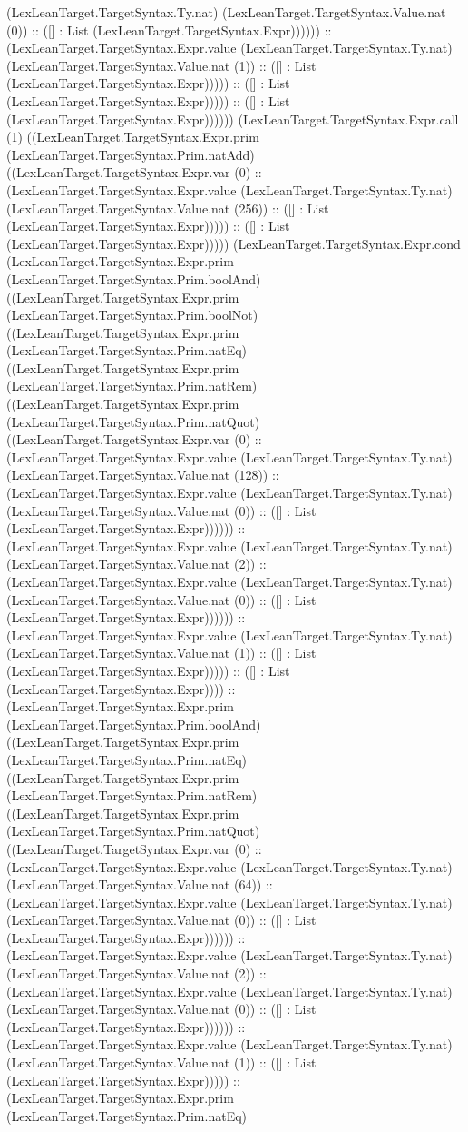 \documentclass[11pt]{article}
\begin{document}
(LexLeanTarget.TargetSyntax.Ty.nat) (LexLeanTarget.TargetSyntax.Value.nat (0)) :: ([] : List (LexLeanTarget.TargetSyntax.Expr)))))) :: (LexLeanTarget.TargetSyntax.Expr.value (LexLeanTarget.TargetSyntax.Ty.nat) (LexLeanTarget.TargetSyntax.Value.nat (1)) :: ([] : List (LexLeanTarget.TargetSyntax.Expr))))) :: ([] : List (LexLeanTarget.TargetSyntax.Expr))))) :: ([] : List (LexLeanTarget.TargetSyntax.Expr)))))) (LexLeanTarget.TargetSyntax.Expr.call (1) ((LexLeanTarget.TargetSyntax.Expr.prim (LexLeanTarget.TargetSyntax.Prim.natAdd) ((LexLeanTarget.TargetSyntax.Expr.var (0) :: (LexLeanTarget.TargetSyntax.Expr.value (LexLeanTarget.TargetSyntax.Ty.nat) (LexLeanTarget.TargetSyntax.Value.nat (256)) :: ([] : List (LexLeanTarget.TargetSyntax.Expr))))) :: ([] : List (LexLeanTarget.TargetSyntax.Expr))))) (LexLeanTarget.TargetSyntax.Expr.cond (LexLeanTarget.TargetSyntax.Expr.prim (LexLeanTarget.TargetSyntax.Prim.boolAnd) ((LexLeanTarget.TargetSyntax.Expr.prim (LexLeanTarget.TargetSyntax.Prim.boolNot) ((LexLeanTarget.TargetSyntax.Expr.prim (LexLeanTarget.TargetSyntax.Prim.natEq) ((LexLeanTarget.TargetSyntax.Expr.prim (LexLeanTarget.TargetSyntax.Prim.natRem) ((LexLeanTarget.TargetSyntax.Expr.prim (LexLeanTarget.TargetSyntax.Prim.natQuot) ((LexLeanTarget.TargetSyntax.Expr.var (0) :: (LexLeanTarget.TargetSyntax.Expr.value (LexLeanTarget.TargetSyntax.Ty.nat) (LexLeanTarget.TargetSyntax.Value.nat (128)) :: (LexLeanTarget.TargetSyntax.Expr.value (LexLeanTarget.TargetSyntax.Ty.nat) (LexLeanTarget.TargetSyntax.Value.nat (0)) :: ([] : List (LexLeanTarget.TargetSyntax.Expr)))))) :: (LexLeanTarget.TargetSyntax.Expr.value (LexLeanTarget.TargetSyntax.Ty.nat) (LexLeanTarget.TargetSyntax.Value.nat (2)) :: (LexLeanTarget.TargetSyntax.Expr.value (LexLeanTarget.TargetSyntax.Ty.nat) (LexLeanTarget.TargetSyntax.Value.nat (0)) :: ([] : List (LexLeanTarget.TargetSyntax.Expr)))))) :: (LexLeanTarget.TargetSyntax.Expr.value (LexLeanTarget.TargetSyntax.Ty.nat) (LexLeanTarget.TargetSyntax.Value.nat (1)) :: ([] : List (LexLeanTarget.TargetSyntax.Expr))))) :: ([] : List (LexLeanTarget.TargetSyntax.Expr)))) :: (LexLeanTarget.TargetSyntax.Expr.prim (LexLeanTarget.TargetSyntax.Prim.boolAnd) ((LexLeanTarget.TargetSyntax.Expr.prim (LexLeanTarget.TargetSyntax.Prim.natEq) ((LexLeanTarget.TargetSyntax.Expr.prim (LexLeanTarget.TargetSyntax.Prim.natRem) ((LexLeanTarget.TargetSyntax.Expr.prim (LexLeanTarget.TargetSyntax.Prim.natQuot) ((LexLeanTarget.TargetSyntax.Expr.var (0) :: (LexLeanTarget.TargetSyntax.Expr.value (LexLeanTarget.TargetSyntax.Ty.nat) (LexLeanTarget.TargetSyntax.Value.nat (64)) :: (LexLeanTarget.TargetSyntax.Expr.value (LexLeanTarget.TargetSyntax.Ty.nat) (LexLeanTarget.TargetSyntax.Value.nat (0)) :: ([] : List (LexLeanTarget.TargetSyntax.Expr)))))) :: (LexLeanTarget.TargetSyntax.Expr.value (LexLeanTarget.TargetSyntax.Ty.nat) (LexLeanTarget.TargetSyntax.Value.nat (2)) :: (LexLeanTarget.TargetSyntax.Expr.value (LexLeanTarget.TargetSyntax.Ty.nat) (LexLeanTarget.TargetSyntax.Value.nat (0)) :: ([] : List (LexLeanTarget.TargetSyntax.Expr)))))) :: (LexLeanTarget.TargetSyntax.Expr.value (LexLeanTarget.TargetSyntax.Ty.nat) (LexLeanTarget.TargetSyntax.Value.nat (1)) :: ([] : List (LexLeanTarget.TargetSyntax.Expr))))) :: (LexLeanTarget.TargetSyntax.Expr.prim (LexLeanTarget.TargetSyntax.Prim.natEq) 
\end{document}
